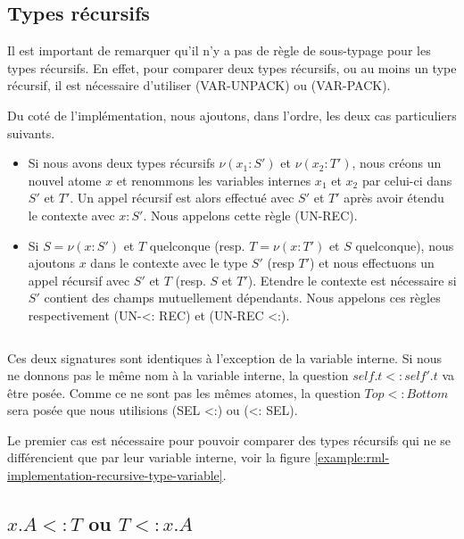 \subsection*{Types récursifs}

Il est important de remarquer qu'il n'y a pas de règle de sous-typage pour les
types récursifs. En effet, pour comparer deux types récursifs, ou au moins un
type récursif, il est nécessaire d'utiliser (VAR-UNPACK) ou (VAR-PACK).

Du coté de l'implémentation, nous ajoutons, dans l'ordre, les deux cas
particuliers suivants.

\begin{itemize}
\item Si nous avons deux types récursifs $\nu(x_{1} : S')$ et $\nu(x_{2} : T')$,
nous créons un nouvel atome $x$ et renommons les variables internes $x_{1}$ et
$x_{2}$ par celui-ci dans $S'$ et $T'$. Un appel récursif est alors effectué
avec $S'$ et $T'$ après avoir étendu le contexte avec $x : S'$. Nous appelons
cette règle (UN-REC).
\item Si $S = \nu(x : S')$ et $T$ quelconque (resp. $T = \nu(x : T')$ et $S$
  quelconque), nous ajoutons $x$ dans le contexte avec le type $S'$ (resp $T'$) et
  nous effectuons un appel récursif avec $S'$ et $T$ (resp. $S$ et $T'$). Etendre
  le contexte est nécessaire si $S'$ contient des champs mutuellement dépendants.
  Nous appelons ces règles respectivement (UN-<: REC) et (UN-REC <:).
\end{itemize}

\begin{listing}
  \inputminted{OCaml}{codes/rml_implementation_recursive_type.rml}
  \caption{Ces deux signatures sont identiques à l'exception de la variable
    interne. Si nous ne donnons pas le même nom à la variable interne, la
    question $self.t <: self'.t$ va être posée. Comme ce ne sont pas les mêmes
    atomes, la question $Top <: Bottom$ sera posée que nous utilisions (SEL <:) ou
    (<: SEL).}
  \label{example:rml-implementation-recursive-type-variable}
\end{listing}

Le premier cas est nécessaire pour pouvoir comparer des types récursifs qui ne
se différencient que par leur variable interne, voir la figure
\ref{example:rml-implementation-recursive-type-variable}.

\subsection*{$x.A <: T$ ou $T <: x.A$}

